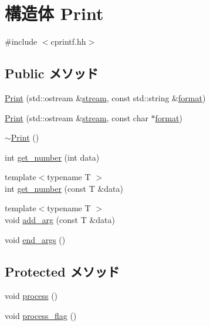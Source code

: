 \hypertarget{structcp_1_1Print}{
\section{構造体 Print}
\label{structcp_1_1Print}
}


{\ttfamily \#include $<$cprintf.hh$>$}\subsection*{Public メソッド}
\begin{DoxyCompactItemize}
\item 
\hyperlink{structcp_1_1Print_a259002c581889b88e75dd96c5d20e3f9}{Print} (std::ostream \&\hyperlink{structcp_1_1Print_aeacb68b8c7e9ae9b97ab9c6ab41940cb}{stream}, const std::string \&\hyperlink{structcp_1_1Print_a6bd2bb5fcc7628a640958994a22f997c}{format})
\item 
\hyperlink{structcp_1_1Print_a1921a2904d61acd5e33435e425be63ae}{Print} (std::ostream \&\hyperlink{structcp_1_1Print_aeacb68b8c7e9ae9b97ab9c6ab41940cb}{stream}, const char $\ast$\hyperlink{structcp_1_1Print_a6bd2bb5fcc7628a640958994a22f997c}{format})
\item 
\hyperlink{structcp_1_1Print_a01f5243d7613ac5562749ebddfdeae13}{$\sim$Print} ()
\item 
int \hyperlink{structcp_1_1Print_a7ff779b170c64fe8385baa7cd803a40b}{get\_\-number} (int data)
\item 
{\footnotesize template$<$typename T $>$ }\\int \hyperlink{structcp_1_1Print_ae054da72c78b75437feddec4c6ad9f3d}{get\_\-number} (const T \&data)
\item 
{\footnotesize template$<$typename T $>$ }\\void \hyperlink{structcp_1_1Print_a1b90bbb1a9c690bf6a6688f386a20b99}{add\_\-arg} (const T \&data)
\item 
void \hyperlink{structcp_1_1Print_a0ae4493963eb6565c9bba273103eebef}{end\_\-args} ()
\end{DoxyCompactItemize}
\subsection*{Protected メソッド}
\begin{DoxyCompactItemize}
\item 
void \hyperlink{structcp_1_1Print_a2e9c5136d19b1a95fc427e0852deab5c}{process} ()
\item 
void \hyperlink{structcp_1_1Print_a1e5dfe5d2bf85ee51a28043a5eb50d91}{process\_\-flag} ()
\end{DoxyCompactItemize}
